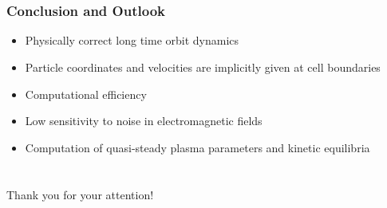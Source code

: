\documentclass{beamer}
\begin{document}
\section{ }
\begin{frame}
\frametitle{Conclusion and Outlook}
\vspace*{-0.5cm}
\begin{itemize}
\item Physically correct long time orbit dynamics
\item Particle coordinates and velocities are implicitly given at cell boundaries
\item Computational efficiency
\item Low sensitivity to noise in electromagnetic fields
\item Computation of quasi-steady plasma parameters and kinetic equilibria
\end{itemize}
\end{frame}




\section{ }
 \begin{frame}
\vspace*{2.5cm}
\centerline{\huge Thank you for your attention!}
 \end{frame}
\end{document}
